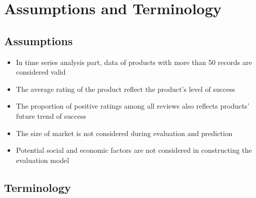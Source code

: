 \documentclass[12pt]{article}
\begin{document}
\section{Assumptions and Terminology}
\subsection{Assumptions}
\begin{itemize}
    \item In time series analysis part, data of products with more than 50 records are considered valid
    \item The average rating of the product reflect the product's level of success
    \item The proportion of positive ratings among all reviews also reflects products' future trend of success
    \item The size of market is not considered during evaluation and prediction
    \item Potential social and economic factors are not considered in constructing the evaluation model
\end{itemize}

\subsection{Terminology}
\end{document}
